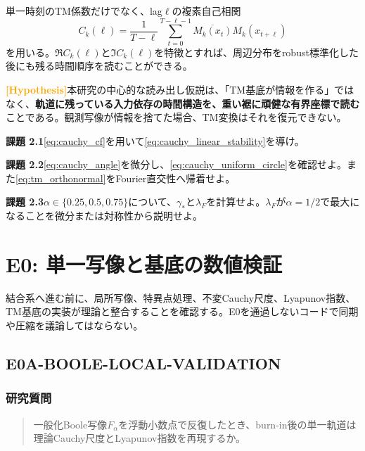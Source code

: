 \documentclass[a4paper,11pt,oneside,openany]{ltjsbook}
\newcommand{\Hypothesis}{\textcolor{Orange}{\sffamily\bfseries [Hypothesis]}}
\begin{document}
単一時刻のTM係数だけでなく、lag\(\ell\)の複素自己相関
\begin{equation}
  C_{k}(\ell)
  =\frac{1}{T-\ell}
   \sum_{t=0}^{T-\ell-1}
   \overline{M_k(x_t)}M_k(x_{t+\ell})
  \label{eq:tm_autocorrelation}
\end{equation}
を用いる。\(\Re C_k(\ell)\)と\(\Im C_k(\ell)\)を特徴とすれば、周辺分布をrobust標準化した後にも残る時間順序を読むことができる。

\Hypothesis 本研究の中心的な読み出し仮説は、「TM基底が情報を作る」ではなく、\textbf{軌道に残っている入力依存の時間構造を、重い裾に頑健な有界座標で読む}ことである。観測写像が情報を捨てた場合、TM変換はそれを復元できない。

\begin{taskbox}
\textbf{課題 2.1}\quad \cref{eq:cauchy_cf}を用いて\cref{eq:cauchy_linear_stability}を導け。

\medskip
\textbf{課題 2.2}\quad \cref{eq:cauchy_angle}を微分し、\cref{eq:cauchy_uniform_circle}を確認せよ。また\cref{eq:tm_orthonormal}をFourier直交性へ帰着せよ。

\medskip
\textbf{課題 2.3}\quad \(\alpha\in\{0.25,0.5,0.75\}\)について、\(\gamma_*\)と\(\lambda_F\)を計算せよ。\(\lambda_F\)が\(\alpha=1/2\)で最大になることを微分または対称性から説明せよ。
\end{taskbox}

\chapter{E0: 単一写像と基底の数値検証}
\label{chap:e0}

\begin{purposebox}
結合系へ進む前に、局所写像、特異点処理、不変Cauchy尺度、Lyapunov指数、TM基底の実装が理論と整合することを確認する。E0を通過しないコードで同期や圧縮を議論してはならない。
\end{purposebox}

\section{E0A-BOOLE-LOCAL-VALIDATION}

\subsection{研究質問}

\begin{quote}
一般化Boole写像\(F_\alpha\)を浮動小数点で反復したとき、burn-in後の単一軌道は理論Cauchy尺度とLyapunov指数を再現するか。
\end{quote}
\end{document}
